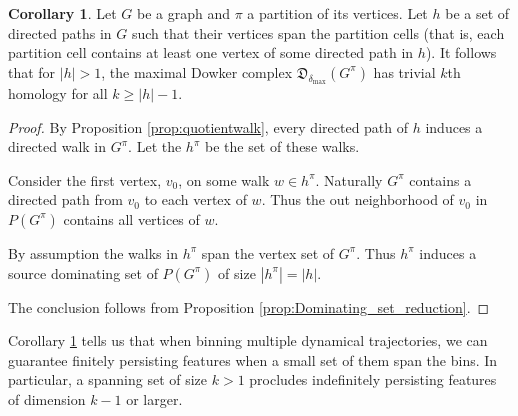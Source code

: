 \documentclass[pdflatex,bst/sn-mathphys-num]{sn-jnl}%
\theoremstyle{thmstyleone}%
\theoremstyle{definition}
\newtheorem{cor}[theorem]{Corollary}
\theoremstyle{thmstyletwo}%
\newcommand{\FD}{\mathfrak{D}}
\theoremstyle{thmstylethree}%
\begin{document}



\begin{cor}\label{cor:disjnt_paths}
    Let $G$ be a graph and $\pi$ a partition of its vertices. Let $h$ be a set of directed paths in $G$ such that their vertices span the partition cells (that is, each partition cell contains at least one vertex of some directed path in $h$). It follows that for $|h|>1$, the maximal Dowker complex $\FD_{\delta_\text{max}}(G^\pi)$ has trivial $k$th homology for all $k\geq |h|-1$.
\end{cor}
\begin{proof}
    By Proposition \ref{prop:quotientwalk}, every directed path of $h$ induces a directed walk in $G^\pi$. Let the $h^\pi$ be the set of these walks.
    
    Consider the first vertex, $v_0$, on some walk $w\in h^\pi$. Naturally $G^\pi$ contains a directed path from $v_0$ to each vertex of $w$. Thus the out neighborhood of $v_0$ in $P(G^\pi)$ contains all vertices of $w$. 
    
    By assumption the walks in $h^\pi$ span the vertex set of $G^\pi$. Thus $h^\pi$ induces a source dominating set of $P(G^\pi)$  of size $|h^\pi|=|h|$.

    The conclusion follows from Proposition \ref{prop:Dominating_set_reduction}.
\end{proof}

Corollary \ref{cor:disjnt_paths} tells us that when binning multiple dynamical trajectories, we can guarantee finitely persisting features when a small set of them span the bins. In particular, a spanning set of size $k>1$ procludes indefinitely persisting features of dimension $k-1$ or larger. 
\end{document}
